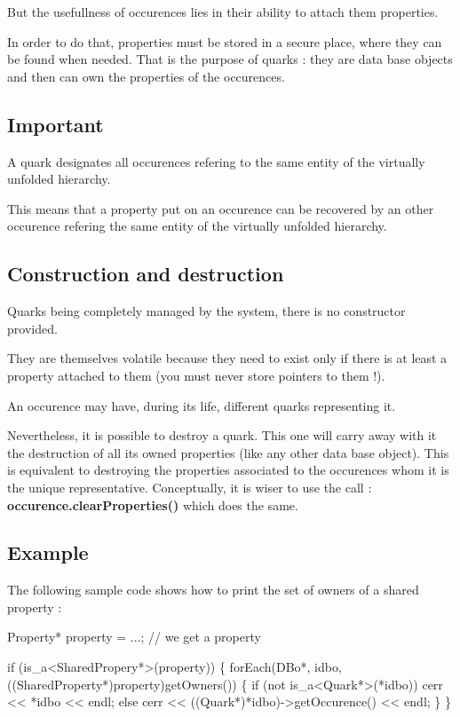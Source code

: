 But the usefullness of occurences lies in their ability to attach them properties.

In order to do that, properties must be stored in a secure place, where they can be found when needed. That is the purpose of quarks \+: they are data base objects and then can own the properties of the occurences.\hypertarget{classHurricane_1_1Quark_secQuarkImportant}{}\subsection{Important}\label{classHurricane_1_1Quark_secQuarkImportant}
A quark designates all occurences refering to the same entity of the virtually unfolded hierarchy.

This means that a property put on an occurence can be recovered by an other occurence refering the same entity of the virtually unfolded hierarchy.\hypertarget{classHurricane_1_1Quark_secQuarkConstructionAndDestruction}{}\subsection{Construction and destruction}\label{classHurricane_1_1Quark_secQuarkConstructionAndDestruction}
Quarks being completely managed by the system, there is no constructor provided.

They are themselves volatile because they need to exist only if there is at least a property attached to them (you must never store pointers to them !).

An occurence may have, during its life, different quarks representing it.

Nevertheless, it is possible to destroy a quark. This one will carry away with it the destruction of all its owned properties (like any other data base object). This is equivalent to destroying the properties associated to the occurences whom it is the unique representative. Conceptually, it is wiser to use the call \+: {\bfseries occurence.\+clear\+Properties()} which does the same.\hypertarget{classHurricane_1_1Quark_secQuarkExample}{}\subsection{Example}\label{classHurricane_1_1Quark_secQuarkExample}
The following sample code shows how to print the set of owners of a shared property \+: 
\begin{DoxyCode}
Property* \textcolor{keyword}{property} = ...; \textcolor{comment}{// we get a property}
 
\textcolor{keywordflow}{if} (is\_a<SharedPropery*>(property)) \{
  forEach(DBo*, idbo, ((SharedProperty*)property)getOwners()) \{
    \textcolor{keywordflow}{if} (not is\_a<Quark*>(*idbo))
      cerr << *idbo << endl;
    \textcolor{keywordflow}{else}
      cerr << ((Quark*)*idbo)->getOccurence() << endl;
  \}
\}
\end{DoxyCode}
 

